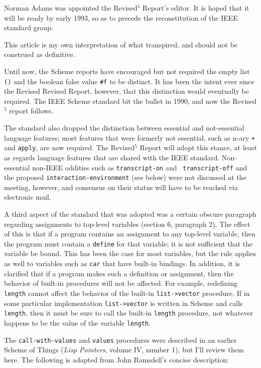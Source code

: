 Norman Adams was appointed the Revised$^5$ Report's editor.  It is
hoped that it will be ready by early 1993, so as to precede the
reconstitution of the IEEE standard group.

This article is my own interpretation of what transpired, and should
not be construed as definitive.



Until now, the Scheme reports have encouraged but not required the
empty list {\tt()} and the boolean false value {\tt\#f} to be
distinct.  It has been the intent ever since the Revised Revised
Report, however, that this distinction would eventually be required.
The IEEE Scheme standard bit the bullet in 1990, and now the
Revised$^5$ report follows.

The standard also dropped the distinction between essential and
not-essential language features; most features that were formerly not
essential, such as n-ary {\tt+} and {\tt apply}, are now required.
The Revised$^5$ Report will adopt this stance, at least as regards
language features that are shared with the IEEE standard.
Non-essential non-IEEE oddities such as {\tt transcript-on} and {\tt
transcript-off} and the proposed {\tt interaction-\ok{}environment} (see
below) were not discussed at the meeting, however, and consensus on
their status will have to be reached via electronic mail.

A third aspect of the standard that was adopted was a certain obscure
paragraph regarding assignments to top-level variables (section 6,
paragraph 2).  The effect of this is that if a program contains an
assignment to any top-level variable, then the program must contain a
{\tt define} for that variable; it is not sufficient that the variable
be bound.  This has been the case for most variables, but the rule
applies as well to variables such as {\tt car} that have built-in
bindings.  In addition, it is clarified that if a program makes such a
definition or assignment, then the behavior of built-in procedures
will not be affected.  For example, redefining {\tt length} cannot
affect the behavior of the built-in {\tt list->vector} procedure.
If in some particular implementation {\tt list->vector} is written
in Scheme and calls {\tt length}, then it must be sure to call the
built-in {\tt length} procedure, not whatever happens to be the value
of the variable {\tt length}.



The {\tt call-with-values} and {\tt values} procedures were described
in an earlier Scheme of Things ({\em Lisp Pointers}, volume IV, number
1), but I'll review them here.  The following is adapted from John Ramsdell's
concise description:

